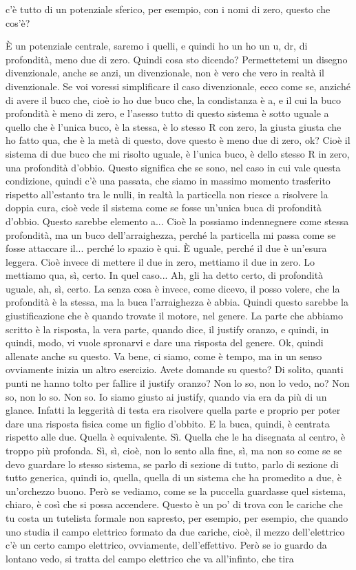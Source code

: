 {\begin{soluzione}
c'è tutto di un potenziale sferico, per esempio, con i nomi di zero, questo che cos'è? 
   
   È un potenziale centrale, saremo i quelli, e quindi ho un ho un u, dr, di profondità, meno due di zero. Quindi cosa sto dicendo? Permettetemi un disegno divenzionale, anche se anzi, un divenzionale, non è vero che vero in realtà il divenzionale. Se voi voressi simplificare il caso divenzionale, ecco come se, anziché di avere il buco che, cioè io ho due buco che, la condistanza è a, e il cui la buco profondità è meno di zero, e l'asesso tutto di questo sistema è sotto uguale a quello che è l'unica buco, è la stessa, è lo stesso R con zero, la giusta giusta che ho fatto qua, che è la metà di questo, dove questo è meno due di zero, ok? Cioè il sistema di due buco che mi risolto uguale, è l'unica buco, è dello stesso R in zero, una profondità d'obbio. Questo significa che se sono, nel caso in cui vale questa condizione, quindi c'è una passata, che siamo in massimo momento trasferito rispetto all'estanto tra le nulli, in realtà la particella non riesce a risolvere la doppia cura, cioè vede il sistema come se fosse un'unica buca di profondità d'obbio. Questo sarebbe elemento a... Cioè la possiamo indennegnere come stessa profondità, ma un buco dell'arraighezza, perché la particella mi passa come se fosse attaccare il... perché lo spazio è qui. È uguale, perché il due è un'esura leggera. Cioè invece di mettere il due in zero, mettiamo il due in zero. Lo mettiamo qua, sì, certo. In quel caso... Ah, gli ha detto certo, di profondità uguale, ah, sì, certo. La senza cosa è invece, come dicevo, il posso volere, che la profondità è la stessa, ma la buca l'arraighezza è abbia. Quindi questo sarebbe la giustificazione che è quando trovate il motore, nel genere. La parte che abbiamo scritto è la risposta, la vera parte, quando dice, il justify oranzo, e quindi, in quindi, modo, vi vuole spronarvi e dare una risposta del genere. Ok, quindi allenate anche su questo. Va bene, ci siamo, come è tempo, ma in un senso ovviamente inizia un altro esercizio. Avete domande su questo? Di solito, quanti punti ne hanno tolto per fallire il justify oranzo? Non lo so, non lo vedo, no? Non so, non lo so. Non so. Io siamo giusto ai justify, quando via era da più di un glance. Infatti la leggerità di testa era risolvere quella parte e proprio per poter dare una risposta fisica come un figlio d'obbito. E la buca, quindi, è centrata rispetto alle due. Quella è equivalente. Sì. Quella che le ha disegnata al centro, è troppo più profonda. Sì, sì, cioè, non lo sento alla fine, sì, ma non so come se se devo guardare lo stesso sistema, se parlo di sezione di tutto, parlo di sezione di tutto generica, quindi io, quella, quella di un sistema che ha promedito a due, è un'orchezzo buono. Però se vediamo, come se la puccella guardasse quel sistema, chiaro, è così che si possa accendere. Questo è un po' di trova con le cariche che tu costa un tutelista formale non sapresto, per esempio, per esempio, che quando uno studia il campo elettrico formato da due cariche, cioè, il mezzo dell'elettrico c'è un certo campo elettrico, ovviamente, dell'effettivo. Però se io guardo da lontano vedo, si tratta del campo elettrico che va all'infinto, che tira 
\end{soluzione}}
